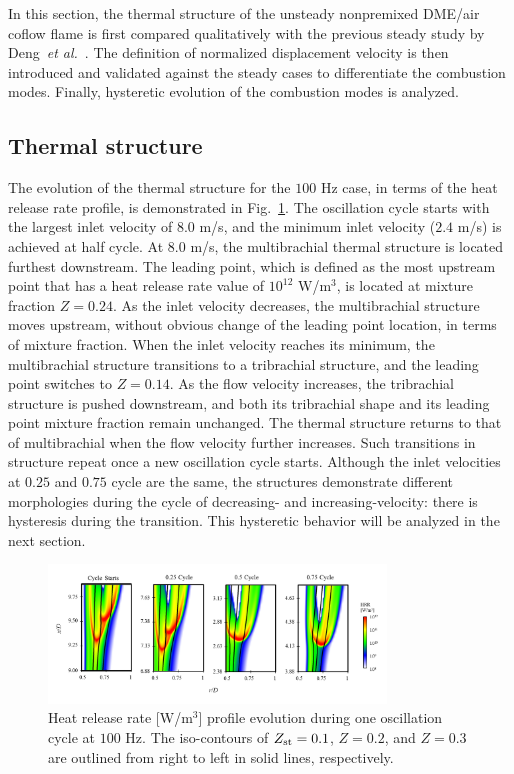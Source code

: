 \documentclass{essci}
\begin{document}
In this section, the thermal structure of the unsteady nonpremixed DME/air coflow flame is first compared qualitatively with the previous steady study by Deng~\emph{et al.}~\cite{deng15b}.  The definition of normalized displacement velocity is then introduced and validated against the steady cases to differentiate the combustion modes.  Finally, hysteretic evolution of the combustion modes is analyzed.

\subsection{Thermal structure}

The evolution of the thermal structure for the $100$ Hz case, in terms of the heat release rate profile, is demonstrated in Fig.~\ref{fig:HRR_100Hz}.  The oscillation cycle starts with the largest inlet velocity of $8.0$ m/s, and the minimum inlet velocity ($2.4$ m/s) is achieved at half cycle.  At $8.0$ m/s, the multibrachial thermal structure is located furthest downstream.  The leading point, which is defined as the most upstream point that has a heat release rate value of $10^{12}$ W/m$^3$, is located at mixture fraction $Z = 0.24$.  As the inlet velocity decreases, the multibrachial structure moves upstream, without obvious change of the leading point location, in terms of mixture fraction.  When the inlet velocity reaches its minimum, the multibrachial structure transitions to a tribrachial structure, and the leading point switches to $Z = 0.14$.  As the flow velocity increases, the tribrachial structure is pushed downstream, and both its tribrachial shape and its leading point mixture fraction remain unchanged.  The thermal structure returns to that of multibrachial when the flow velocity further increases.  Such transitions in structure repeat once a new oscillation cycle starts.  Although the inlet velocities at $0.25$ and $0.75$ cycle are the same, the structures demonstrate different morphologies during the cycle of decreasing- and increasing-velocity: there is hysteresis during the transition.  This hysteretic behavior will be analyzed in the next section. 

\begin{figure}[t]
  \centering
  \scriptsize
  \vspace{-0.10in}
  \includegraphics[trim=6.5mm 7.5mm 7mm 8mm, clip=true, width=0.8\textwidth]{HRR_100Hz.png}
  \normalsize
  \vspace{-0.2in}
  \caption{Heat release rate [W/m$^3$] profile evolution during one oscillation cycle at $100$ Hz.  The iso-contours of $Z_{\rm st} = 0.1$, $Z = 0.2$, and $Z = 0.3$ are outlined from right to left in solid lines, respectively.}
  \label{fig:HRR_100Hz}
\end{figure}
\end{document}
